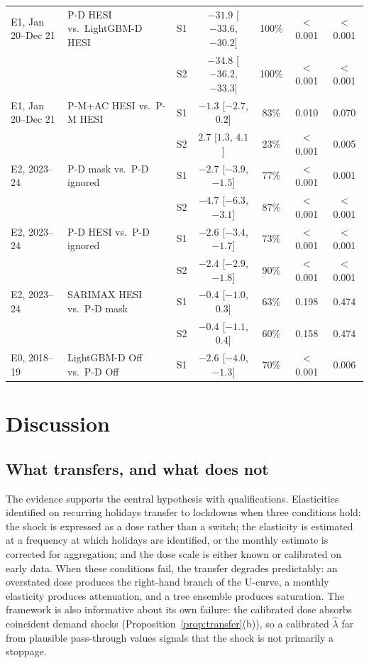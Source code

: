 \documentclass{article}
\theoremstyle{plain}
\theoremstyle{definition}
\theoremstyle{remark}
\begin{document}
\begin{table}[!tb]
\begin{tabular}{lllcccc}
\addlinespace[1pt]
E1, Jan 20--Dec 21 & P-D HESI vs.\ LightGBM-D HESI & S1 & $-31.9$ [$-33.6$, $-30.2$] & 100\% & $<$0.001 & $<$0.001 \\
 &  & S2 & $-34.8$ [$-36.2$, $-33.3$] & 100\% & $<$0.001 & $<$0.001 \\
\addlinespace[1pt]
E1, Jan 20--Dec 21 & P-M+AC HESI vs.\ P-M HESI & S1 & $-1.3$ [$-2.7$, $0.2$] & 83\% & 0.010 & 0.070 \\
 &  & S2 & $2.7$ [$1.3$, $4.1$] & 23\% & $<$0.001 & 0.005 \\
\addlinespace[1pt]
E2, 2023--24 & P-D mask vs.\ P-D ignored & S1 & $-2.7$ [$-3.9$, $-1.5$] & 77\% & $<$0.001 & 0.001 \\
 &  & S2 & $-4.7$ [$-6.3$, $-3.1$] & 87\% & $<$0.001 & $<$0.001 \\
\addlinespace[1pt]
E2, 2023--24 & P-D HESI vs.\ P-D ignored & S1 & $-2.6$ [$-3.4$, $-1.7$] & 73\% & $<$0.001 & $<$0.001 \\
 &  & S2 & $-2.4$ [$-2.9$, $-1.8$] & 90\% & $<$0.001 & $<$0.001 \\
\addlinespace[1pt]
E2, 2023--24 & SARIMAX HESI vs.\ P-D mask & S1 & $-0.4$ [$-1.0$, $0.3$] & 63\% & 0.198 & 0.474 \\
 &  & S2 & $-0.4$ [$-1.1$, $0.4$] & 60\% & 0.158 & 0.474 \\
\addlinespace[1pt]
E0, 2018--19 & LightGBM-D Off vs.\ P-D Off & S1 & $-2.6$ [$-4.0$, $-1.3$] & 70\% & $<$0.001 & 0.006 \\
\bottomrule
\end{tabular}
\end{table}

\section{Discussion}\label{sec:discussion}
\subsection{What transfers, and what does not}
The evidence supports the central hypothesis with qualifications. Elasticities identified on recurring holidays transfer to lockdowns when three conditions hold: the shock is expressed as a dose rather than a switch; the elasticity is estimated at a frequency at which holidays are identified, or the monthly estimate is corrected for aggregation; and the dose scale is either known or calibrated on early data. When these conditions fail, the transfer degrades predictably: an overstated dose produces the right-hand branch of the U-curve, a monthly elasticity produces attenuation, and a tree ensemble produces saturation. The framework is also informative about its own failure: the calibrated dose absorbs coincident demand shocks (Proposition~\ref{prop:transfer}(b)), so a calibrated $\hat\lambda$ far from plausible pass-through values signals that the shock is not primarily a stoppage.
\end{document}
